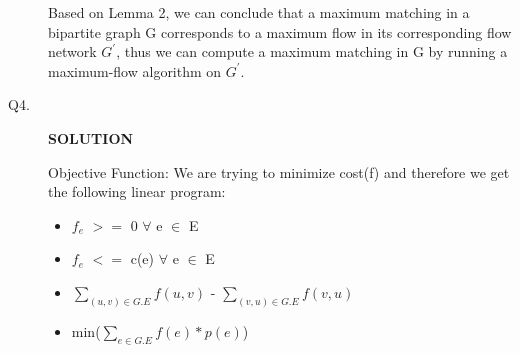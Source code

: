 \documentclass[11pt]{csc_assignment}
\begin{document}
\begin{description}
Based on Lemma 2, we can conclude that a maximum matching in a bipartite graph G corresponds to a maximum flow in its corresponding flow network $G^{'}$, thus we can compute a maximum matching in G by running a maximum-flow algorithm on $G^{'}$.

\newpage
\item[Q4.]


\textbf{SOLUTION}

Objective Function: We are trying to minimize cost(f) and therefore we get the following linear program:

\begin{itemize}
	\item $f_e$ $>=$ 0 $\forall$ e $\in$ E
	\item $f_e$ $<=$ c(e) $\forall$ e $\in$ E
	\item $\sum\limits_{(u, v) \in G.E} f(u,v)$ - $\sum\limits_{(v, u) \in G.E} f(v,u)$
	\item min($\sum\limits_{e \in G.E} f(e)*p(e)$)
\end{itemize}



\end{description}
\end{document}
